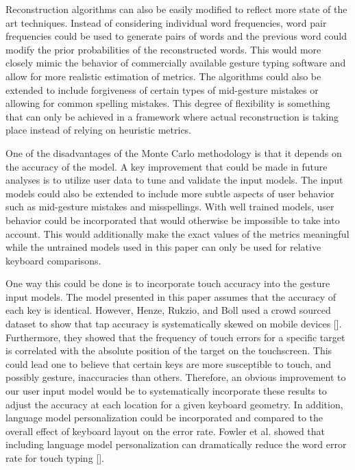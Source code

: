 \documentclass[final,1p,times,authoryear]{elsarticle}
\begin{document}
Reconstruction algorithms can also be easily modified to reflect more state of the art techniques.
Instead of considering individual word frequencies, word pair frequencies could be used to generate pairs of words and the previous word could modify the prior probabilities of the reconstructed words.
This would more closely mimic the behavior of commercially available gesture typing software and allow for more realistic estimation of metrics.
The algorithms could also be extended to include forgiveness of certain types of mid-gesture mistakes or allowing for common spelling mistakes.
This degree of flexibility is something that can only be achieved in a framework where actual reconstruction is taking place instead of relying on heuristic metrics.

One of the disadvantages of the Monte Carlo methodology is that it depends on the accuracy of the model.
A key improvement that could be made in future analyses is to utilize user data to tune and validate the input models.
The input models could also be extended to include more subtle aspects of user behavior such as mid-gesture mistakes and misspellings.
With well trained models, user behavior could be incorporated that would otherwise be impossible to take into account.
This would additionally make the exact values of the metrics meaningful while the untrained models used in this paper can only be used for relative keyboard comparisons.

One way this could be done is to incorporate touch accuracy into the gesture input models.
The model presented in this paper assumes that the accuracy of each key is identical.
However, Henze, Rukzio, and Boll used a crowd sourced dataset to show that tap accuracy is systematically skewed on mobile devices [\cite{TouchAccuracy}].
Furthermore, they showed that the frequency of touch errors for a specific target is correlated with the absolute position of the target on the touchscreen.
This could lead one to believe that certain keys are more susceptible to touch, and possibly gesture, inaccuracies than others.
Therefore, an obvious improvement to our user input model would be to systematically incorporate these results to adjust the accuracy at each location for a given keyboard geometry.
In addition, language model personalization could be incorporated and compared to the overall effect of keyboard layout on the error rate.
Fowler et al\mbox{.} showed that including language model personalization can dramatically reduce the word error rate for touch typing [\cite{Fowler}].
\end{document}
